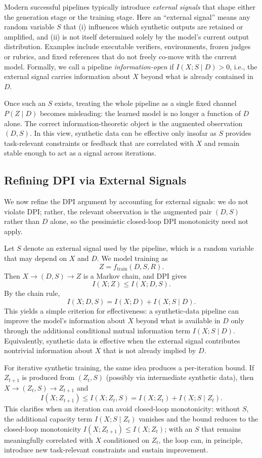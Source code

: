\documentclass{article}
\theoremstyle{plain}
\theoremstyle{definition}
\theoremstyle{remark}
\begin{document}
Modern successful pipelines typically introduce \textit{external signals} that shape either the generation stage or the training stage. Here an ``external signal'' means any random variable $S$ that (i) influences which synthetic outputs are retained or amplified, and (ii) is not itself determined solely by the model's current output distribution. Examples include executable verifiers, environments, frozen judges or rubrics, and fixed references that do not freely co-move with the current model. Formally, we call a pipeline \textit{information-open} if $I(X;S \mid D)>0$, i.e., the external signal carries information about $X$ beyond what is already contained in $D$.

Once such an $S$ exists, treating the whole pipeline as a single fixed channel $P(Z \mid D)$ becomes misleading: the learned model is no longer a function of $D$ alone. The correct information-theoretic object is the augmented observation $(D,S)$. In this view, synthetic data can be effective only insofar as $S$ provides task-relevant constraints or feedback that are correlated with $X$ and remain stable enough to act as a signal across iterations.

\subsection{Refining DPI via External Signals}

We now refine the DPI argument by accounting for external signals: we do not violate DPI; rather, the relevant observation is the augmented pair $(D,S)$ rather than $D$ alone, so the pessimistic closed-loop DPI monotonicity need not apply.

Let $S$ denote an external signal used by the pipeline, which is a random variable that may depend on $X$ and $D$. We model training as
\[
Z  =  f_{\mathrm{train}}(D,S,R).
\]
Then $X \to (D,S) \to Z$ is a Markov chain, and DPI gives
\[
I(X;Z) \le  I(X;D,S).
\]
By the chain rule,
\[
I(X;D,S)=I(X;D)+I(X;S \mid D).
\]
This yields a simple criterion for effectiveness: a synthetic-data pipeline can improve the model's information about $X$ beyond what is available in $D$ only through the additional conditional mutual information term $I(X;S \mid D)$. Equivalently, synthetic data is effective when the external signal contributes nontrivial information about $X$ that is not already implied by $D$.

For iterative synthetic training, the same idea produces a per-iteration bound. If $Z_{t+1}$ is produced from $(Z_t,S)$ (possibly via intermediate synthetic data), then $X \to (Z_t,S) \to Z_{t+1}$ and
\[
I(X;Z_{t+1})  \le  I(X;Z_t,S)
 =  I(X;Z_t) + I(X;S \mid Z_t).
\]
This clarifies when an iteration can avoid closed-loop monotonicity: without $S$, the additional capacity term $I(X;S \mid Z_t)$ vanishes and the bound reduces to the closed-loop monotonicity $I(X;Z_{t+1}) \le I(X;Z_t)$; with an $S$ that remains meaningfully correlated with $X$ conditioned on $Z_t$, the loop can, in principle, introduce new task-relevant constraints and sustain improvement.
\end{document}
